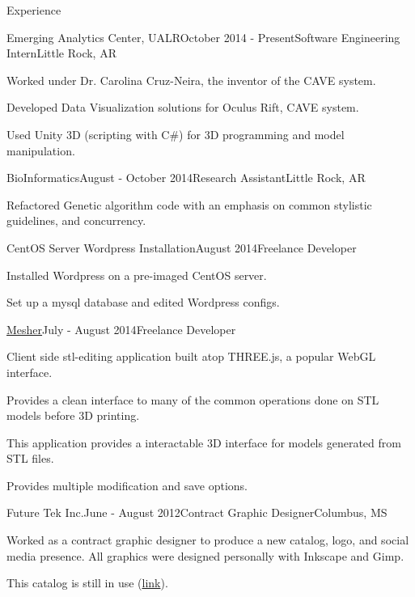 \documentclass{resume} %
\begin{document}
\begin{rSection}{Experience}

\begin{rSubsection}{Emerging Analytics Center, UALR}{October 2014 - Present}{Software Engineering Intern}{Little Rock, AR}

	\item Worked under Dr. Carolina Cruz-Neira, the inventor of the CAVE system.
	\item Developed Data Visualization solutions for Oculus Rift, CAVE system.
	\item Used Unity 3D (scripting with C\#) for 3D programming and model manipulation.
\end{rSubsection}

\begin{rSubsection}{BioInformatics}{August - October 2014}{Research Assistant}{Little Rock, AR}

	\item Refactored Genetic algorithm code with an emphasis on common stylistic guidelines, and concurrency.
\end{rSubsection}

\begin{rSubsection}{CentOS Server Wordpress Installation}{August 2014}{Freelance Developer}{}

	\item Installed Wordpress on a pre-imaged CentOS server.
	\item Set up a mysql database and edited Wordpress configs.
\end{rSubsection}

\begin{rSubsection}{\href{http://github.com/cptaffe/Mesher}{Mesher}}{July - August 2014}{Freelance Developer}{}

	\item Client side stl-editing application built atop THREE.js, a popular WebGL interface.
	\item Provides a clean interface to many of the common operations done on STL models before 3D printing.
	\item This application provides a interactable 3D interface for models generated from STL files.
	\item Provides multiple modification and save options.
\end{rSubsection}

\begin{rSubsection}{Future Tek Inc.}{June - August 2012}{Contract Graphic Designer}{Columbus, MS}

	\item Worked as a contract graphic designer to produce a new catalog, logo, and social media presence. All graphics were designed personally with Inkscape and Gimp.
	\item This catalog is still in use (\href{http://www.futuretekinc.com/wp-content/uploads/2014/08/Future-Tek-Catalog.pdf}{link}).
\end{rSubsection}

\end{rSection}
\end{document}
